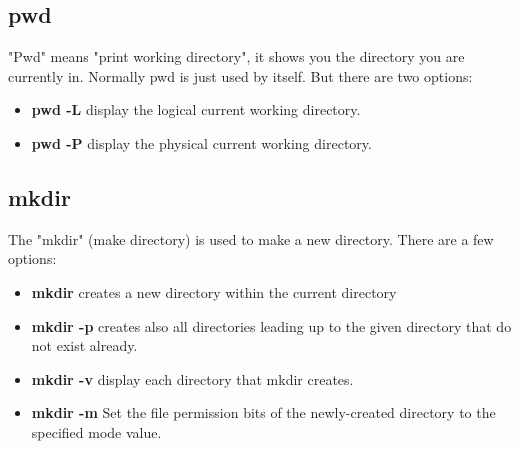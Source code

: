 \documentclass[10pt,a4paper]{scrartcl}
\begin{document}
\subsection{pwd}
\begin{singlespacing}
"Pwd" means "print working directory", it shows you the directory you are currently in. Normally pwd is just used by itself. But there are two options:
\end{singlespacing}
\begin{doublespacing}
\begin{itemize}
\item{\bf{pwd -L}} \qquad display the logical current working directory.
\item{\bf{pwd -P}} \qquad display the physical current working directory.
\end{itemize}
\end{doublespacing}

\subsection{mkdir}
\begin{singlespacing}
The "mkdir" (make directory) is used to make a new directory. There are a few options:
\end{singlespacing}
\begin{doublespacing}
\begin{itemize}
\item{\bf{mkdir}} \qquad creates a new directory within the current directory
\item{\bf{mkdir -p}} \qquad creates also all directories leading up to the given directory that do not exist already.
\item{\bf{mkdir -v}} \qquad display each directory that mkdir creates.
\item{\bf{mkdir -m}} \qquad Set the file permission bits of the newly-created directory to the specified mode value.
\end{itemize}
\end{doublespacing}
\end{document}
